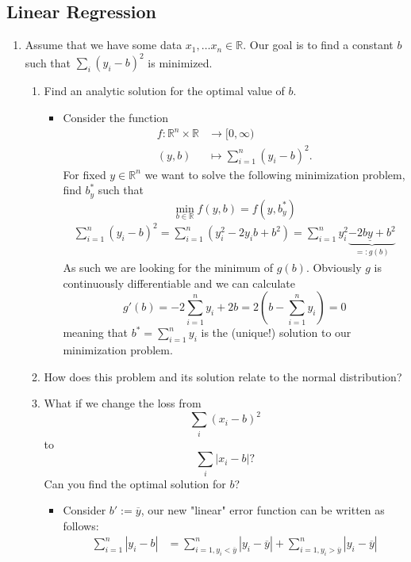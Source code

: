 \documentclass{article}
\begin{document}
\subsection{Linear Regression}
\begin{enumerate}[label=\arabic*.]
\item Assume that we have some data $x_1, \dots x_n \in \mathbb{R}$. Our goal is to find a constant $b$ such that $\sum_i (y_i - b)^2$ is minimized.
	\begin{enumerate}[label=\arabic*.]
	\item Find an analytic solution for the optimal value of $b$.
		\begin{itemize}
			\item Consider the function
			\begin{align*}
			f : \mathbb{R}^n \times \mathbb{R} &\rightarrow [0, \infty) \\
			(y, b) &\mapsto \sum_{i = 1}^n (y_i - b)^2.
			\end{align*}
			For fixed $y \in \mathbb{R}^n$ we want to solve the following minimization problem, find $b^*_y$ such that
			$$
			\min_{b \in \mathbb{R}} f(y, b) = f(y, b^*_y)
			$$
			\begin{align*}
			\sum_{i = 1}^n (y_i - b)^2 = \sum_{i = 1}^n (y_i^2 - 2y_i b + b^2) = \sum_{i = 1}^n y_i^2 \underbrace{- 2 b \underline{y} + b^2}_{=: g(b)}
			\end{align*}
			As such we are looking for the minimum of $g(b)$. Obviously $g$ is continuously differentiable and we can calculate
			$$
			g'(b) = -2 \sum_{i = 1}^n y_i + 2b = 2 (b - \sum_{i = 1}^n y_i) = 0
			$$
			meaning that $b^* = \sum_{i = 1}^n y_i$ is the (unique!) solution to our minimization problem.
		\end{itemize}
	\item How does this problem and its solution relate to the normal distribution?
	\item What if we change the loss from
		\begin{equation*}
		\sum_i (x_i - b)^2
		\end{equation*}
		to
		\begin{equation*}
		\sum_i |x_i - b|?
		\end{equation*}
		Can you find the optimal solution for $b$?
			\begin{itemize}
				\item Consider $b' := \overline{y}$, our new "linear" error function can be written as follows:
				\begin{align*}
				\sum_{i = 1}^n |y_i - b| &= \sum_{i = 1, y_i < \overline{y}}^n |y_i - \overline{y}| + \sum_{i = 1, y_i > \overline{y}}^n |y_i - \overline{y}| \\

\end{align*}
\end{itemize}
\end{enumerate}
\end{enumerate}
\end{document}
